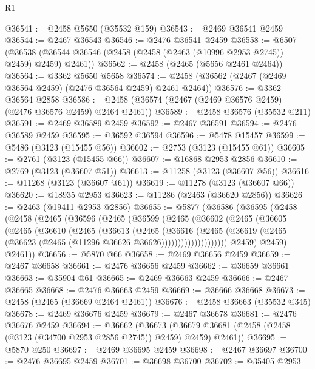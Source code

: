 \begin{lexlean}{R1}
\begin{coremodule}
@36541 := @2458 @5650 (@35532 @159)
@36543 := @2469 @36541 @2459
@36544 := @2467 @36543
@36546 := @2476 @36541 @2459
@36558 := @6507
    (@36538 (@36544 @36546 (@2458 (@2458 (@2463 (@10996 @2953 @2745)) @2459) @2459) @2461))
@36562 := @2458 (@2465 (@5656 @2461 @2464))
@36564 := @3362 @5650 @5658
@36574 := @2458 (@36562 (@2467 (@2469 @36564 @2459) (@2476 @36564 @2459) @2461 @2464))
@36576 := @3362 @36564 @2858
@36586 := @2458 (@36574 (@2467 (@2469 @36576 @2459) (@2476 @36576 @2459) @2464 @2461))
@36589 := @2458 @36576 (@35532 @211)
@36591 := @2469 @36589 @2459
@36592 := @2467 @36591
@36594 := @2476 @36589 @2459
@36595 := @36592 @36594
@36596 := @5478 @15457
@36599 := @5486 (@3123 (@15455 @56))
@36602 := @2753 (@3123 (@15455 @61))
@36605 := @2761 (@3123 (@15455 @66))
@36607 := @16868 @2953 @2856
@36610 := @2769 (@3123 (@36607 @51))
@36613 := @11258 (@3123 (@36607 @56))
@36616 := @11268 (@3123 (@36607 @61))
@36619 := @11278 (@3123 (@36607 @66))
@36620 := @18935 @2953
@36623 := @11286 (@2463 (@36620 @2856))
@36626 := @2463 (@19411 @2953 @2856)
@36655 := @5877
    (@36586
      (@36595
        (@2458
          (@2458
            (@2465
              (@36596
                (@2465
                  (@36599
                    (@2465
                      (@36602
                        (@2465
                          (@36605
                            (@2465
                              (@36610
                                (@2465
                                  (@36613
                                    (@2465
                                      (@36616
                                        (@2465
                                          (@36619
                                            (@2465
                                              (@36623
                                                (@2465 (@11296 @36626 @36626))))))))))))))))))))
            @2459)
          @2459)
        @2461))
@36656 := @5870 @66
@36658 := @2469 @36656 @2459
@36659 := @2467 @36658
@36661 := @2476 @36656 @2459
@36662 := @36659 @36661
@36663 := @35904 @61
@36665 := @2469 @36663 @2459
@36666 := @2467 @36665
@36668 := @2476 @36663 @2459
@36669 := @36666 @36668
@36673 := @2458 (@2465 (@36669 @2464 @2461))
@36676 := @2458 @36663 (@35532 @345)
@36678 := @2469 @36676 @2459
@36679 := @2467 @36678
@36681 := @2476 @36676 @2459
@36694 := @36662
    (@36673 (@36679 @36681 (@2458 (@2458 (@3123 (@34700 @2953 @2856 @2745)) @2459) @2459) @2461))
@36695 := @5870 @250
@36697 := @2469 @36695 @2459
@36698 := @2467 @36697
@36700 := @2476 @36695 @2459
@36701 := @36698 @36700
@36702 := @35405 @2953

\end{coremodule}
\end{lexlean}
